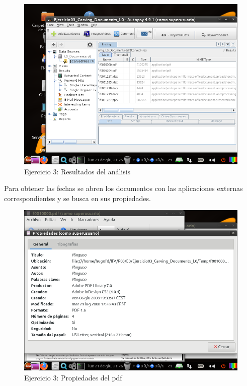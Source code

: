 \documentclass[11pt]{article}
\begin{document}
\begin{figure}[H]
    \caption{Ejercicio 3: Resultados del análisis}
    \centering
    \includegraphics[scale=0.7]{e3-5.png}
\end{figure}

Para obtener las fechas se abren los documentos con las aplicaciones externas correspondientes y se busca en sus propiedades.

\begin{figure}[H]
    \caption{Ejercicio 3: Propiedades del pdf}
    \centering
    \includegraphics[scale=0.7]{e3-6.png}
\end{figure}
\end{document}
